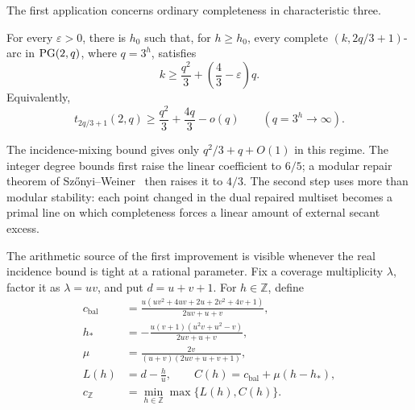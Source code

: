 The first application concerns ordinary completeness in characteristic
three.

\begin{theorem}\label{thm:characteristic-three}
For every \(\varepsilon>0\), there is \(h_0\) such that, for \(h\ge h_0\),
every complete \((k,2q/3+1)\)-arc in \(\mathrm{PG}(2,q)\), where \(q=3^h\), satisfies
\begin{equation}\label{eq:characteristic-three-bound}
 k\ge \frac{q^2}{3}+\left(\frac43-\varepsilon\right)q.
\end{equation}
Equivalently,
\[
 t_{2q/3+1}(2,q)\ge \frac{q^2}{3}+\frac{4q}{3}-o(q)
 \qquad (q=3^h\to\infty).
\]
\end{theorem}

The incidence-mixing bound gives only \(q^2/3+q+O(1)\) in this regime.  The
integer degree bounds first raise the linear coefficient to \(6/5\); a
modular repair theorem of Sz\H{o}nyi--Weiner~\cite{SWmodp} then raises it to
\(4/3\).  The second step uses more than modular stability: each point changed
in the dual repaired multiset becomes a primal line on which completeness
forces a linear amount of external secant excess.

The arithmetic source of the first improvement is visible whenever the real
incidence bound is tight at a rational parameter.  Fix a coverage multiplicity
\(\lambda\), factor it as
\(\lambda=uv\), and put \(d=u+v+1\).  For \(h\in\mathbb Z\), define
\begin{align}
 c_{\mathrm{bal}}
 &=\frac{u(uv^2+4uv+2u+2v^2+4v+1)}{2uv+u+v},\label{eq:c-balanced}\\
 h_*&=-\frac{u(v+1)(u^2v+u^2-v)}{2uv+u+v},\label{eq:h-star}\\
 \mu&=\frac{2v}{(u+v)(2uv+u+v+1)},\nonumber\\
 L(h)&=d-\frac hu,\qquad
 C(h)=c_{\mathrm{bal}}+\mu(h-h_*),\nonumber\\
 c_{\mathbb Z}&=\min_{h\in\mathbb Z}\max\{L(h),C(h)\}.
 \label{eq:c-integer}
\end{align}

